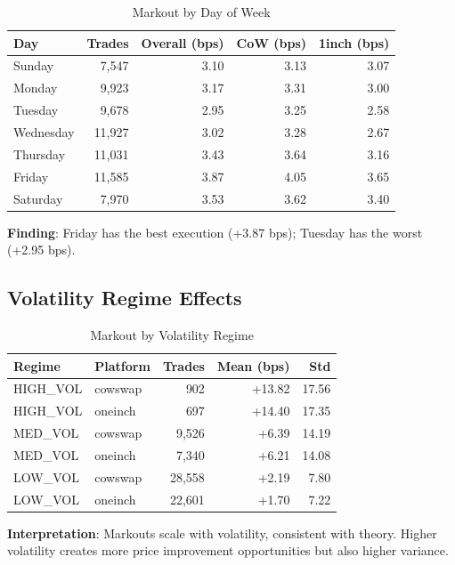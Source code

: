 \documentclass[11pt,a4paper]{article}
\begin{document}
\begin{table}[H]
\centering
\caption{Markout by Day of Week}
\begin{tabular}{lrrrr}
\toprule
\textbf{Day} & \textbf{Trades} & \textbf{Overall (bps)} & \textbf{CoW (bps)} & \textbf{1inch (bps)} \\
\midrule
Sunday & 7,547 & 3.10 & 3.13 & 3.07 \\
Monday & 9,923 & 3.17 & 3.31 & 3.00 \\
Tuesday & 9,678 & 2.95 & 3.25 & 2.58 \\
Wednesday & 11,927 & 3.02 & 3.28 & 2.67 \\
Thursday & 11,031 & 3.43 & 3.64 & 3.16 \\
Friday & 11,585 & 3.87 & 4.05 & 3.65 \\
Saturday & 7,970 & 3.53 & 3.62 & 3.40 \\
\bottomrule
\end{tabular}
\end{table}

\textbf{Finding}: Friday has the best execution (+3.87 bps); Tuesday has the worst (+2.95 bps).

\subsection{Volatility Regime Effects}

\begin{table}[H]
\centering
\caption{Markout by Volatility Regime}
\begin{tabular}{llrrr}
\toprule
\textbf{Regime} & \textbf{Platform} & \textbf{Trades} & \textbf{Mean (bps)} & \textbf{Std} \\
\midrule
HIGH\_VOL & cowswap & 902 & +13.82 & 17.56 \\
HIGH\_VOL & oneinch & 697 & +14.40 & 17.35 \\
MED\_VOL & cowswap & 9,526 & +6.39 & 14.19 \\
MED\_VOL & oneinch & 7,340 & +6.21 & 14.08 \\
LOW\_VOL & cowswap & 28,558 & +2.19 & 7.80 \\
LOW\_VOL & oneinch & 22,601 & +1.70 & 7.22 \\
\bottomrule
\end{tabular}
\end{table}

\textbf{Interpretation}: Markouts scale with volatility, consistent with theory. Higher volatility creates more price improvement opportunities but also higher variance.
\end{document}
